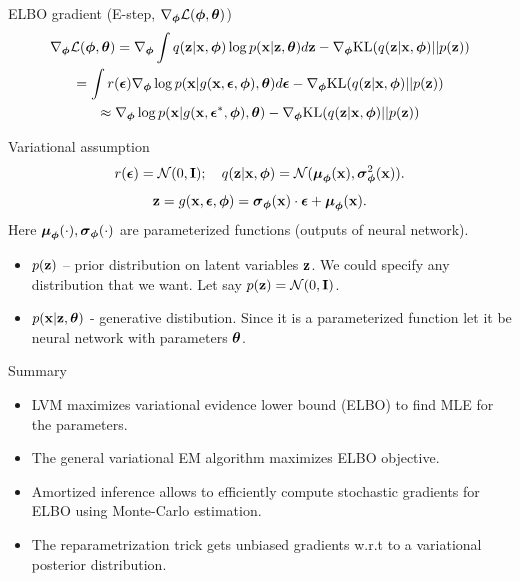 \begin{frame}{ELBO gradient (E-step, $\nabla_{\boldsymbol{\phi}} \mathcal{L}(\boldsymbol{\phi}, \boldsymbol{\theta})$)}
	\vspace{-0.5cm}
	\begin{multline*}
		\nabla_{\boldsymbol{\phi}} \mathcal{L} (\boldsymbol{\phi}, \boldsymbol{\theta}) = \nabla_{\boldsymbol{\phi}}\int q(\mathbf{z}|\mathbf{x}, \boldsymbol{\phi}) \log p(\mathbf{x}| \mathbf{z}, \boldsymbol{\theta})  d\mathbf{z} - \nabla_{\boldsymbol{\phi}} \text{KL}(q(\mathbf{z} | \mathbf{x}, \boldsymbol{\phi}) || p(\mathbf{z}))
		\\ = \int r(\boldsymbol{\epsilon}) \nabla_{\boldsymbol{\phi}} \log p(\mathbf{x} | g(\mathbf{x}, \boldsymbol{\epsilon}, \boldsymbol{\phi}), \boldsymbol{\theta}) d\boldsymbol{\epsilon}  - \nabla_{\boldsymbol{\phi}} \text{KL}(q(\mathbf{z} | \mathbf{x}, \boldsymbol{\phi}) || p(\mathbf{z}))
		\\ \approx \nabla_{\boldsymbol{\phi}} \log p(\mathbf{x} | g(\mathbf{x}, \boldsymbol{\epsilon}^*, \boldsymbol{\phi}), \boldsymbol{\theta})  - \nabla_{\boldsymbol{\phi}} \text{KL}(q(\mathbf{z} | \mathbf{x}, \boldsymbol{\phi}) || p(\mathbf{z}))
	\end{multline*}
	\vspace{-0.5cm}
	\begin{block}{Variational assumption}
		\vspace{-0.3cm}
		\[
		r(\boldsymbol{\epsilon}) = \mathcal{N}(0, \mathbf{I}); \quad  q(\mathbf{z}| \mathbf{x}, \boldsymbol{\phi}) = \mathcal{N} (\boldsymbol{\mu}_{\boldsymbol{\phi}}(\mathbf{x}), \boldsymbol{\sigma}^2_{\boldsymbol{\phi}}(\mathbf{x})).
		\]
		\[
		\mathbf{z} = g(\mathbf{x}, \boldsymbol{\epsilon}, \boldsymbol{\phi}) = \boldsymbol{\sigma}_{\boldsymbol{\phi}}(\mathbf{x}) \cdot \boldsymbol{\epsilon} + \boldsymbol{\mu}_{\boldsymbol{\phi}}(\mathbf{x}).
		\]
		Here $\boldsymbol{\mu}_{\boldsymbol{\phi}}(\cdot), \boldsymbol{\sigma}_{\boldsymbol{\phi}}(\cdot)$ are parameterized functions (outputs of neural network).
	\end{block}
	\begin{itemize}
		\item $p(\mathbf{z})$ -- prior distribution on latent variables $\mathbf{z}$. We could specify any distribution that we want. Let say $p(\mathbf{z}) = \mathcal{N} (0, \mathbf{I})$.
		\item $p(\mathbf{x} | \mathbf{z}, \boldsymbol{\theta})$ - generative distibution. Since it is a parameterized function let it be neural network with parameters $\boldsymbol{\theta}$.
	\end{itemize}
\end{frame}
\begin{frame}{Summary}
	\begin{itemize}
		\item LVM maximizes variational evidence lower bound (ELBO) to find MLE for the parameters.
		\vfill
		\item The general variational EM algorithm maximizes ELBO objective.
		\vfill
		\item Amortized inference allows to efficiently compute stochastic gradients for ELBO using Monte-Carlo estimation.
		\vfill
		\item The reparametrization trick gets unbiased gradients w.r.t to a variational posterior distribution.
	\end{itemize}
\end{frame}
 